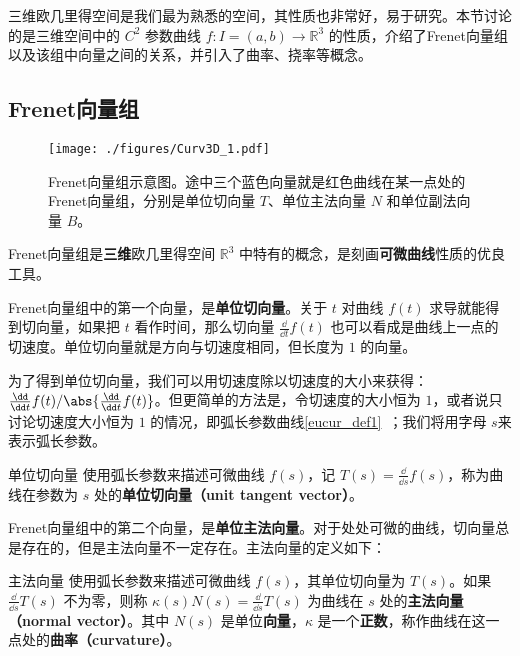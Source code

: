 

三维欧几里得空间是我们最为熟悉的空间，其性质也非常好，易于研究。本节讨论的是三维空间中的 $C^2$ 参数曲线 $f: I = (a, b) \to \mathbb{R}^3$ 的性质，介绍了Frenet向量组以及该组中向量之间的关系，并引入了曲率、挠率等概念。

\subsection{Frenet向量组}

\begin{figure}[ht]
\centering
\texttt{[image: ./figures/Curv3D\_1.pdf]}
\caption{Frenet向量组示意图。途中三个蓝色向量就是红色曲线在某一点处的Frenet向量组，分别是单位切向量 $T$、单位主法向量 $N$ 和单位副法向量 $B$。} \label{Curv3D_fig1}
\end{figure}

Frenet向量组是\textbf{三维}欧几里得空间 $\mathbb{R}^3$ 中特有的概念，是刻画\textbf{可微曲线}性质的优良工具。

Frenet向量组中的第一个向量，是\textbf{单位切向量}。关于 $t$ 对曲线 $f(t)$ 求导就能得到切向量，如果把 $t$ 看作时间，那么切向量 $\frac{\dd}{\dd t}f(t)$ 也可以看成是曲线上一点的切速度。单位切向量就是方向与切速度相同，但长度为 $1$ 的向量。

为了得到单位切向量，我们可以用切速度除以切速度的大小来获得：$\frac{\dd}{\dd t}f(t)/\abs{\frac{\dd}{\dd t}f(t)}$。但更简单的方法是，令切速度的大小恒为 $1$，或者说只讨论切速度大小恒为 $1$ 的情况，即弧长参数曲线\autoref{eucur_def1}~；我们将用字母 $s$来表示弧长参数。

\begin{definition}{单位切向量}\label{Curv3D_def1}
使用弧长参数来描述可微曲线 $f(s)$，记 $T(s)=\frac{\dd}{\dd s}f(s)$，称为曲线在参数为 $s$ 处的\textbf{单位切向量（unit tangent vector）}。
\end{definition}

Frenet向量组中的第二个向量，是\textbf{单位主法向量}。对于处处可微的曲线，切向量总是存在的，但是主法向量不一定存在。主法向量的定义如下：

\begin{definition}{主法向量}\label{Curv3D_def2}
使用弧长参数来描述可微曲线 $f(s)$，其单位切向量为 $T(s)$。如果 $\frac{\dd}{\dd s}T(s)$ 不为零，则称 $\kappa(s) N(s)=\frac{\dd}{\dd s}T(s)$ 为曲线在 $s$ 处的\textbf{主法向量（normal vector）}。其中 $N(s)$ 是单位\textbf{向量}，$\kappa$ 是一个\textbf{正数}，称作曲线在这一点处的\textbf{曲率（curvature）}。
\end{definition}

